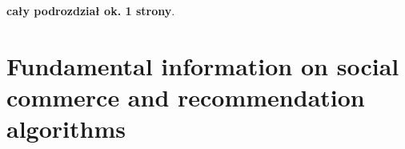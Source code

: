 \documentclass[12pt]{report}
\begin{document}
{\bf cały podrozdział ok. 1 strony}.




\chapter[Fundamental information on social...]{Fundamental information on social commerce and recommendation algorithms} \label{fundamental_info}





\end{document}
